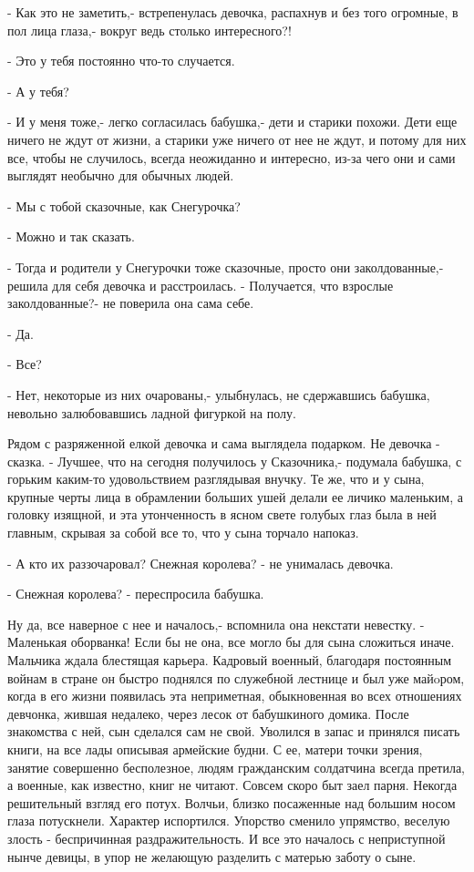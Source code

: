 - Как это не заметить,- встрепенулась девочка, распахнув и без того огромные, в
пол лица глаза,- вокруг ведь столько интересного?!

- Это у тебя постоянно что-то случается.

- А у тебя?

- И у меня тоже,- легко согласилась бабушка,- дети и старики похожи. Дети еще
ничего не ждут от жизни, а старики уже ничего от нее не ждут, и потому для них
все, чтобы не случилось, всегда неожиданно и интересно, из-за чего они и сами
выглядят необычно для обычных людей.

- Мы с тобой сказочные, как Снегурочка?

- Можно и так сказать.

- Тогда и родители у Снегурочки тоже сказочные, просто они заколдованные,-
решила для себя девочка и расстроилась. - Получается, что взрослые
заколдованные?- не поверила она сама себе.

- Да.

- Все?

- Нет, некоторые из них очарованы,- улыбнулась, не сдержавшись бабушка,
невольно залюбовавшись ладной фигуркой на полу.

Рядом с разряженной елкой девочка и сама выглядела подарком. Не девочка -
сказка. - Лучшее, что на сегодня получилось у Сказочника,- подумала бабушка, с
горьким каким-то удовольствием разглядывая внучку. Те же, что и у сына, крупные
черты лица в обрамлении больших ушей делали ее личико маленьким, а головку
изящной, и эта утонченность в ясном свете голубых глаз была в ней главным,
скрывая за собой все то, что у сына торчало напоказ.

- А кто их раззочаровал? Снежная королева? - не унималась девочка.

- Снежная королева? - переспросила бабушка.

Ну да, все наверное с нее и началось,- вспомнила она некстати невестку. -
Маленькая оборванка! Если бы не она, все могло бы для сына сложиться иначе.
Мальчика ждала блестящая карьера. Кадровый военный, благодаря постоянным
войнам в стране он быстро поднялся по служебной лестнице и был уже майoром,
когда в его жизни появилась эта неприметная, обыкновенная во всех отношениях
девчонка, жившая недалеко, через лесок от бабушкиного домика. После
знакомства с ней, сын сделался сам не свой. Уволился в запас и принялся
писать книги, на все лады описывая армейские будни. С  ее, матери точки
зрения, занятие совершенно бесполезное, людям гражданским солдатчина всегда
претила, а военные, как известно, книг не читают. Совсем скоро быт заел
парня. Некогда решительный взгляд его потух. Волчьи, близко посаженные над
большим носом глаза потускнели. Характер испортился. Упорство сменило
упрямство, веселую злость - беспричинная раздражительность. И все это
началось с неприступной нынче девицы, в упор не желающую разделить с матерью
заботу о сыне.

